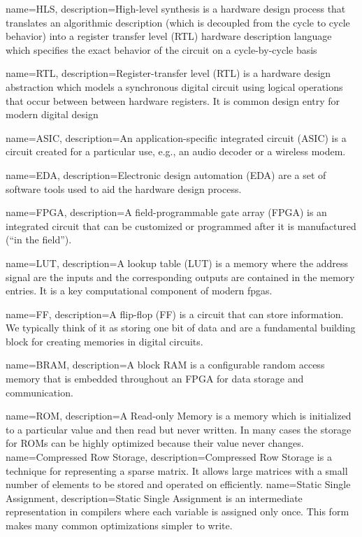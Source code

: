 
{
	name={HLS},
    	description={High-level synthesis is a hardware design process that translates an algorithmic description (which is decoupled from the cycle to cycle behavior) into a register transfer level (RTL) hardware description language which specifies the exact behavior of the circuit on a cycle-by-cycle basis}
}

{
	name={RTL},
    	description={Register-transfer level (RTL) is a hardware design abstraction which models a synchronous digital circuit using logical operations that occur between between hardware registers. It is common design entry for modern digital design}
}

{
	name={ASIC},
    	description={An application-specific integrated circuit (ASIC) is a circuit created for a particular use, e.g., an audio decoder or a wireless modem. }
}

{
	name={EDA},
    	description={Electronic design automation (EDA) are a set of software tools used to aid the hardware design process.  }
}

{
	name={FPGA},
    	description={A field-programmable gate array (FPGA) is an integrated circuit that can be customized or programmed after it is manufactured (``in the field''). }
}

{
	name={LUT},
    	description={A lookup table (LUT) is a memory where the address signal are the inputs and the corresponding outputs are contained in the memory entries. It is a key computational component of modern \gls{fpga}s.}
}

{
	name={FF},
    	description={A flip-flop (FF) is a circuit that can store information. We typically think of it as storing one bit of data and are a fundamental building block for creating memories in digital circuits.}
}

{
	name={BRAM},
    	description={A block RAM is a configurable random access memory that is embedded throughout an FPGA for data storage and communication.}
}

{
	name={ROM},
    	description={A Read-only Memory is a memory which is initialized to a particular value and then read but never written.  In many cases the storage for ROMs can be highly optimized because their value never changes.}
}
{
	name={Compressed Row Storage},
    	description={Compressed Row Storage is a technique for representing a sparse matrix.  It allows large matrices with a small number of elements to be stored and operated on efficiently.}
}
{
	name={Static Single Assignment},
    	description={Static Single Assignment is an intermediate representation in compilers where each variable is assigned only once.  This form makes many common optimizations simpler to write.}
}

